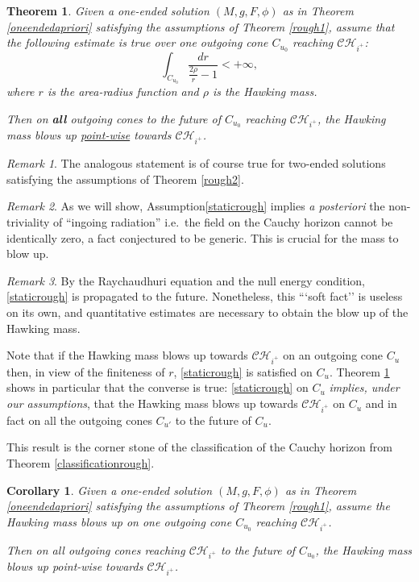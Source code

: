 \documentclass[10pt,a4paper]{article}
\theoremstyle{plain}
\newtheorem{theo}{Theorem}
\newtheorem{coreo}{Corollary}
\theoremstyle{remark}
\newtheorem{rmk}{Remark}[section]
\theoremstyle{definition}
\theoremstyle{plain}
\theoremstyle{remark}
\theoremstyle{definition}
\newcommand{\CH}{\mathcal{CH}_{i^+}}
\numberwithin{equation}{section}
\begin{document}
 \begin{theo} \label{blowuprough} Given a one-ended solution $(M,g,F,\phi)$ as in Theorem \ref{oneendedapriori} satisfying the assumptions of Theorem \ref{rough1}, assume that the following estimate is true over one outgoing cone $C_{u_0}$ reaching $\CH$: \begin{equation} \label{staticrough}
 	\int_{C_{u_0}} \frac{dr}{ \frac{2\rho}{r}-1} <+\infty,
 	\end{equation} where $r$ is the area-radius function and $\rho$ is the Hawking mass.
 	
 	Then on \textbf{all} outgoing cones to the future of $C_{u_0}$ reaching $\CH$, the Hawking mass blows up \underline{point-wise}  towards $\CH$. \end{theo}  \begin{rmk}
 	The analogous statement is of course true for two-ended solutions  satisfying the assumptions of Theorem \ref{rough2}.
 \end{rmk} \begin{rmk} \label{rmkblowuprough}
As we will show, Assumption\eqref{staticrough} implies \textit{a posteriori} \color{black} the non-triviality of ``ingoing radiation'' i.e.\ the field on the Cauchy horizon cannot be identically zero, a fact conjectured to be generic. This is crucial for the mass to blow up.
\end{rmk}\begin{rmk} \label{monotonicityremark}
By the Raychaudhuri equation and the null energy condition,  \eqref{staticrough} is propagated to the future. Nonetheless, this ```soft fact'' is useless on its own, and quantitative estimates are necessary to obtain the blow up of the Hawking mass.
\end{rmk}
Note that if the Hawking mass blows up  towards $\CH$ on an outgoing cone $C_{u}$ then, in view of the finiteness of $r$, \eqref{staticrough} is satisfied on $C_{u}$. Theorem \ref{blowuprough} shows in particular that the converse is true: \eqref{staticrough} on $C_u$ \textit{implies, under our assumptions}, that the Hawking mass blows up  towards $\CH$ on $C_{u}$ and in fact on all the outgoing cones $C_{u'}$ to the future of $C_u$. \color{black}

  This result is the corner stone of  the classification of the Cauchy horizon from  Theorem \ref{classificationrough}.



\begin{coreo} Given a one-ended solution  $(M,g,F,\phi)$ as in Theorem \ref{oneendedapriori} satisfying the assumptions of Theorem \ref{rough1}, assume the Hawking mass blows up on one outgoing cone $C_{u_0}$ reaching $\CH$.
	
	Then on all outgoing cones reaching $\CH$ to the future of $C_{u_0}$, the Hawking mass blows up point-wise towards $\CH$. \end{coreo}
\end{document}
